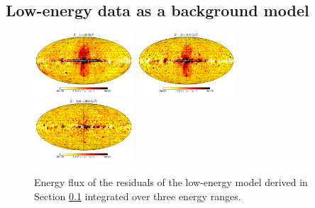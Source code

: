 \subsection{Low-energy data as a background model}
\label{sec:le_data_model}

\begin{figure}[t]
\includegraphics[width=0.33\textwidth]{plots/Mollweide_LowE_03-10GeV_flux_source_range_0.pdf}
\includegraphics[width=0.33\textwidth]{plots/Mollweide_LowE_03-10GeV_flux_source_range_1.pdf}
\includegraphics[width=0.33\textwidth]{plots/Mollweide_LowE_03-10GeV_flux_source_range_2.pdf}
\caption{Energy flux of the residuals of the low-energy model derived in Section \ref{sec:le_data_model}
integrated over three energy ranges. }
\label{fig:Maps_lowE}
\end{figure}

